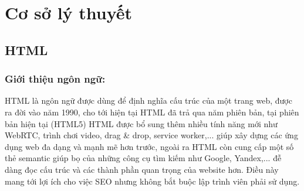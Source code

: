 \chapter{Cơ sở lý thuyết}
\section{HTML}
\subsection{Giới thiệu ngôn ngữ:}
HTML là ngôn ngữ được dùng để định nghĩa cấu trúc của một trang web, được ra đời vào năm 1990, cho tới hiện tại HTML đã trả qua năm phiên bản, tại phiên bản hiện tại (HTML5) HTML được bổ sung thêm nhiều tính năng mới như WebRTC, trình chơi video, drag \& drop, service worker,... giúp xây dựng các ứng dụng web đa dạng và mạnh mẽ hơn trước, ngoài ra HTML còn cung cấp một số thẻ semantic giúp bọ của những công cụ tìm kiếm như Google, Yandex,... đễ dàng đọc cấu trúc và các thành phần quan trọng của website hơn. Điều này mang tới lợi ích cho việc SEO nhưng không bắt buộc lập trình viên phải sử dụng.\par
